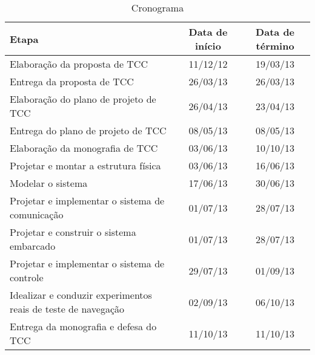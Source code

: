 \begin{table}[!htb]
\caption{Cronograma} \label{tab:crono}
\begin{center}
	\begin{tabularx}{\textwidth}{|X|c|c|}
	\hline
	\textbf{Etapa} & \textbf{Data de início} & \textbf{Data de término} \\
	\hline
	Elaboração da proposta de TCC &
	11/12/12 & 19/03/13 \\
	\hline
	Entrega da proposta de TCC &
	26/03/13 & 26/03/13 \\
	\hline
	Elaboração do plano de projeto de TCC &
	26/04/13 & 23/04/13 \\
	\hline
	Entrega do plano de projeto de TCC &
	08/05/13 & 08/05/13 \\
	\hline
	Elaboração da monografia de TCC &
	03/06/13 & 10/10/13 \\
	\hline
	Projetar e montar a estrutura física &
	03/06/13 & 16/06/13 \\
	\hline
	Modelar o sistema &
	17/06/13 & 30/06/13 \\
	\hline
	Projetar e implementar o sistema de comunicação &
	01/07/13 & 28/07/13 \\
	\hline
	Projetar e construir o sistema embarcado &
	01/07/13 & 28/07/13 \\
	\hline
	Projetar e implementar o sistema de controle &
	29/07/13 & 01/09/13 \\
	\hline
	Idealizar e conduzir experimentos reais de teste de navegação &
	02/09/13 & 06/10/13 \\
	\hline
	Entrega da monografia e  defesa do TCC &
	11/10/13 & 11/10/13 \\
	\hline	
	\end{tabularx}
\end{center}
\end{table}